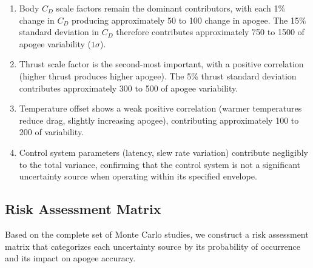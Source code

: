 \documentclass[11pt,letterpaper]{article}
\newcommand{\Cd}{C_D}
\begin{document}
\begin{enumerate}[nosep]
    \item Body $\Cd$ scale factors remain the dominant contributors, with each 1\% change in $\Cd$ producing approximately \SI{50}{\ft} to \SI{100}{\ft} change in apogee. The 15\% standard deviation in $\Cd$ therefore contributes approximately \SI{750}{\ft} to \SI{1500}{\ft} of apogee variability ($1\sigma$).

    \item Thrust scale factor is the second-most important, with a positive correlation (higher thrust produces higher apogee). The 5\% thrust standard deviation contributes approximately \SI{300}{\ft} to \SI{500}{\ft} of apogee variability.

    \item Temperature offset shows a weak positive correlation (warmer temperatures reduce drag, slightly increasing apogee), contributing approximately \SI{100}{\ft} to \SI{200}{\ft} of variability.

    \item Control system parameters (latency, slew rate variation) contribute negligibly to the total variance, confirming that the control system is not a significant uncertainty source when operating within its specified envelope.
\end{enumerate}

\subsection{Risk Assessment Matrix}
\label{sec:risk_assessment}

Based on the complete set of Monte Carlo studies, we construct a risk assessment matrix that categorizes each uncertainty source by its probability of occurrence and its impact on apogee accuracy.
\end{document}
